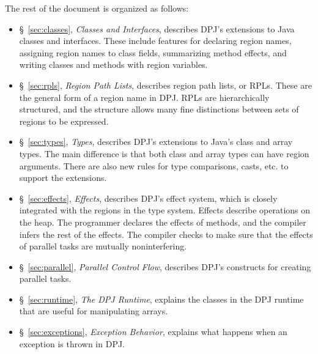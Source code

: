 The rest of the document is organized as follows:
%
\begin{itemize}
%
\item \S~\ref{sec:classes}, \emph{Classes and Interfaces}, describes
  DPJ's extensions to Java classes and interfaces.  These include
  features for declaring region names, assigning region names to class
  fields, summarizing method effects, and writing classes and methods
  with region variables.
%
\item \S~\ref{sec:rpls}, \emph{Region Path Lists}, describes region
  path lists, or RPLs.  These are the general form of a region name in
  DPJ.  RPLs are hierarchically structured, and the structure allows
  many fine distinctions between sets of regions to be expressed.
%
\item \S~\ref{sec:types}, \emph{Types}, describes DPJ's extensions to
  Java's class and array types.  The main difference is that both
  class and array types can have region arguments.  There are also new
  rules for type comparisons, casts, etc. to support the extensions.
%
\item \S~\ref{sec:effects}, \emph{Effects}, describes DPJ's effect
  system, which is closely integrated with the regions in the type
  system.  Effects describe operations on the heap.  The programmer
  declares the effects of methods, and the compiler infers the rest of
  the effects.  The compiler checks to make sure that the effects of
  parallel tasks are mutually noninterfering.
%
\item \S~\ref{sec:parallel}, \emph{Parallel Control Flow}, describes
  DPJ's constructs for creating parallel tasks.
%
\item \S~\ref{sec:runtime}, \emph{The DPJ Runtime}, explains the classes in
  the DPJ runtime that are useful for manipulating arrays.
%
\item \S~\ref{sec:exceptions}, \emph{Exception Behavior}, explains
  what happens when an exception is thrown in DPJ.
%
\end{itemize}


